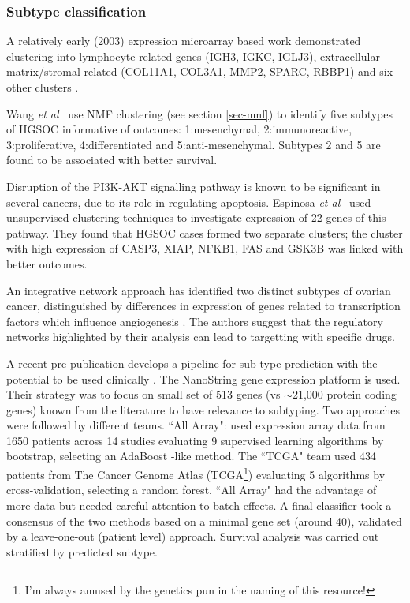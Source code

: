 \documentclass[tikz, 12pt,a4paper,oneside,fleqn]{article}
\newcommand{\etal}{{\em et al\/}}
\begin{document}
\subsubsection{Subtype classification}
\label{sec-subtype-classification}

A relatively early (2003) expression microarray based work demonstrated clustering into lymphocyte related genes (IGH3, IGKC, IGLJ3), extracellular matrix/stromal related (COL11A1, COL3A1, MMP2, SPARC, RBBP1) and six other clusters \cite{Schaner2003}.

Wang \etal\ \cite{Wang2017c} use NMF clustering (see section \ref{sec-nmf}) to identify five subtypes of HGSOC informative of outcomes: 1:mesenchymal, 2:immunoreactive, 3:proliferative, 4:differentiated and 5:anti-mesenchymal.
Subtypes 2 and 5 are found to be associated with better survival.

Disruption of the PI3K-AKT signalling pathway is known to be significant in several cancers, due to its role in regulating apoptosis.  
Espinosa \etal\ \cite{Espinosa2011} used unsupervised clustering techniques to investigate expression of 22 genes of this pathway.  
They found that HGSOC cases formed two separate clusters; the cluster with high expression of CASP3, XIAP, NFKB1, FAS and GSK3B was linked with better outcomes.

An integrative network approach has identified two distinct subtypes of ovarian cancer, distinguished by differences in expression of genes related to transcription factors which influence angiogenesis \cite{Glass2015}.  The authors suggest that the regulatory networks highlighted by their analysis can lead to targetting with specific drugs.

A recent pre-publication develops a pipeline for sub-type prediction with the potential to be used clinically \cite{Talhouk2020}.
The NanoString gene expression platform is used.  Their strategy was to focus on small set of 513 genes (vs $\sim$21,000 protein coding genes) known from the literature to have relevance to subtyping.
Two approaches were followed by different teams.  ``All Array": used expression array data from 1650 patients across 14 studies evaluating 9 supervised learning algorithms by bootstrap, selecting an AdaBoost -like method. The ``TCGA" team used 434 patients from The Cancer Genome Atlas (TCGA\footnote{I'm always amused by the genetics pun in the naming of this resource!}) evaluating 5 algorithms by cross-validation, selecting a random forest.  ``All Array" had the advantage of more data but needed careful attention to batch effects. A final classifier took a consensus of the two methods based on a minimal gene set (around 40), validated by a leave-one-out (patient level) approach.  Survival analysis was carried out stratified by predicted subtype.
\end{document}
